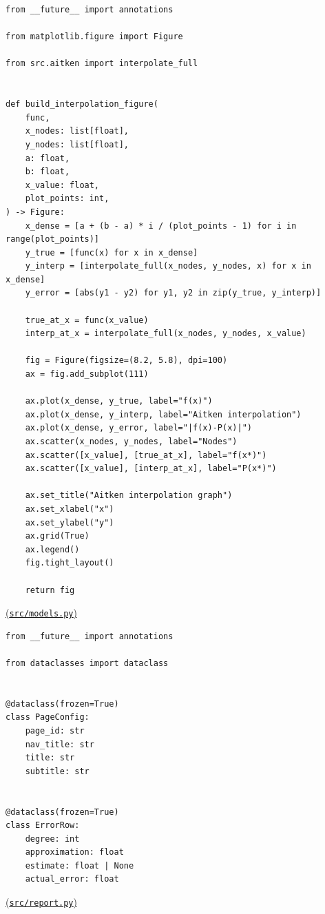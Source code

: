 \documentclass[12pt,a4paper]{article}
\begin{document}
    \begin{verbatim}
from __future__ import annotations

from matplotlib.figure import Figure

from src.aitken import interpolate_full


def build_interpolation_figure(
    func,
    x_nodes: list[float],
    y_nodes: list[float],
    a: float,
    b: float,
    x_value: float,
    plot_points: int,
) -> Figure:
    x_dense = [a + (b - a) * i / (plot_points - 1) for i in range(plot_points)]
    y_true = [func(x) for x in x_dense]
    y_interp = [interpolate_full(x_nodes, y_nodes, x) for x in x_dense]
    y_error = [abs(y1 - y2) for y1, y2 in zip(y_true, y_interp)]

    true_at_x = func(x_value)
    interp_at_x = interpolate_full(x_nodes, y_nodes, x_value)

    fig = Figure(figsize=(8.2, 5.8), dpi=100)
    ax = fig.add_subplot(111)

    ax.plot(x_dense, y_true, label="f(x)")
    ax.plot(x_dense, y_interp, label="Aitken interpolation")
    ax.plot(x_dense, y_error, label="|f(x)-P(x)|")
    ax.scatter(x_nodes, y_nodes, label="Nodes")
    ax.scatter([x_value], [true_at_x], label="f(x*)")
    ax.scatter([x_value], [interp_at_x], label="P(x*)")

    ax.set_title("Aitken interpolation graph")
    ax.set_xlabel("x")
    ax.set_ylabel("y")
    ax.grid(True)
    ax.legend()
    fig.tight_layout()

    return fig
    \end{verbatim}

    \noindent
    \underline{(\texttt{src/models.py})}

    \begin{verbatim}
from __future__ import annotations

from dataclasses import dataclass


@dataclass(frozen=True)
class PageConfig:
    page_id: str
    nav_title: str
    title: str
    subtitle: str


@dataclass(frozen=True)
class ErrorRow:
    degree: int
    approximation: float
    estimate: float | None
    actual_error: float
    \end{verbatim}

    \noindent
    \underline{(\texttt{src/report.py})}
\end{document}
